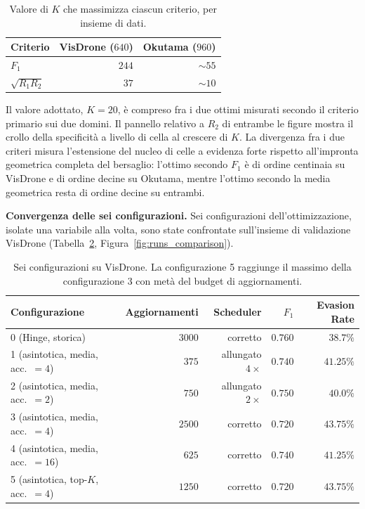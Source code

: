 \documentclass[a4paper,12pt]{report}
\begin{document}
\begin{table}[t]
\centering
\begin{tabular}{lrr}
\toprule
Criterio & VisDrone ($640$) & Okutama ($960$) \\
\midrule
$F_1$ & $244$ & $\sim 55$ \\
$\sqrt{R_1 R_2}$ & $37$ & $\sim 10$ \\
\bottomrule
\end{tabular}
\caption{Valore di $K$ che massimizza ciascun criterio, per insieme di dati.}
\label{tab:k_ottimo}
\end{table}

Il valore adottato, $K = 20$, è compreso fra i due ottimi misurati secondo il criterio primario sui due domini. Il pannello relativo a $R_2$ di entrambe le figure mostra il crollo della specificità a livello di cella al crescere di $K$. La divergenza fra i due criteri misura l'estensione del nucleo di celle a evidenza forte rispetto all'impronta geometrica completa del bersaglio: l'ottimo secondo $F_1$ è di ordine centinaia su VisDrone e di ordine decine su Okutama, mentre l'ottimo secondo la media geometrica resta di ordine decine su entrambi.

\textbf{Convergenza delle sei configurazioni.}
\label{sec:sei_config}
Sei configurazioni dell'ottimizzazione, isolate una variabile alla volta, sono state confrontate sull'insieme di validazione VisDrone (Tabella~\ref{tab:sei_config}, Figura~\ref{fig:runs_comparison}).

\begin{table}[t]
\centering
\begin{tabular}{lrrrr}
\toprule
Configurazione & Aggiornamenti & Scheduler & $F_1$ & Evasion Rate \\
\midrule
0 (Hinge, storica) & $3000$ & corretto & $0.760$ & $38.7\%$ \\
1 (asintotica, media, acc.\ $=4$) & $375$ & allungato $4\times$ & $0.740$ & $41.25\%$ \\
2 (asintotica, media, acc.\ $=2$) & $750$ & allungato $2\times$ & $0.750$ & $40.0\%$ \\
3 (asintotica, media, acc.\ $=4$) & $2500$ & corretto & $0.720$ & $43.75\%$ \\
4 (asintotica, media, acc.\ $=16$) & $625$ & corretto & $0.740$ & $41.25\%$ \\
5 (asintotica, top-$K$, acc.\ $=4$) & $1250$ & corretto & $0.720$ & $43.75\%$ \\
\bottomrule
\end{tabular}
\caption{Sei configurazioni su VisDrone. La configurazione 5 raggiunge il massimo della configurazione 3 con metà del budget di aggiornamenti.}
\label{tab:sei_config}
\end{table}
\end{document}
